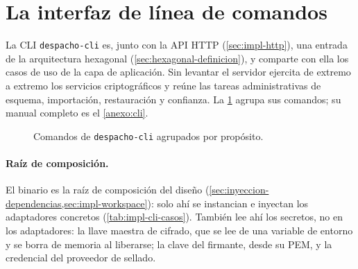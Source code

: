 
\section{La interfaz de línea de comandos}\label{sec:impl-cli}

La CLI \texttt{despacho-cli} es, junto con la API HTTP (\cref{sec:impl-http}), una entrada de la arquitectura hexagonal (\cref{sec:hexagonal-definicion}), y comparte con ella los casos de uso de la capa de aplicación. Sin levantar el servidor ejercita de extremo a extremo los servicios criptográficos y reúne las tareas administrativas de esquema, importación, restauración y confianza. La \cref{fig:impl-cli-arbol} agrupa sus comandos; su manual completo es el \cref{anexo:cli}.

\begin{figure}[!htbp]
  \centering
  
  \caption{Comandos de \texttt{despacho-cli} agrupados por propósito.}
  \label{fig:impl-cli-arbol}
\end{figure}

\paragraph{Raíz de composición.} El binario es la raíz de composición del diseño (\cref{sec:inyeccion-dependencias,sec:impl-workspace}): solo ahí se instancian e inyectan los adaptadores concretos (\cref{tab:impl-cli-casos}). También lee ahí los secretos, no en los adaptadores: la llave maestra de cifrado, que se lee de una variable de entorno y se borra de memoria al liberarse; la clave del firmante, desde su PEM, y la credencial del proveedor de sellado.

